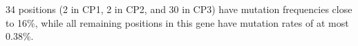 34 positions (2 in CP1, 2 in CP2, and 30 in CP3) have mutation frequencies close to 16\%, while all remaining positions in this gene have mutation rates of at most 0.38\%.\endinput